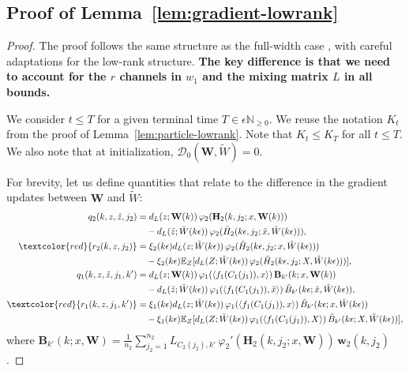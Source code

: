 \subsection{Proof of Lemma~\ref{lem:gradient-lowrank}}

\begin{proof}
The proof follows the same structure as the full-width case \cite{nguyen2020global}, with careful adaptations for the low-rank structure. \textbf{The key difference is that we need to account for the $r$ channels in $w_1$ and the mixing matrix $L$ in all bounds.}

We consider $t \le T$ for a given terminal time $T \in \epsilon\mathbb{N}_{\ge 0}$. We reuse the notation $K_t$ from the proof of Lemma~\ref{lem:particle-lowrank}. Note that $K_t \le K_T$ for all $t \le T$. We also note that at initialization, $\mathscr{D}_0(\mathbf{W}, \tilde{W}) = 0$.

For brevity, let us define quantities that relate to the difference in the gradient updates between $\mathbf{W}$ and $\tilde{W}$:
\begin{align*}
q_2(k, z, \tilde{z}, j_2) &= d_L(z; \mathbf{W}(k))\,\varphi_2(\mathbf{H}_2(k, j_2; x, \mathbf{W}(k)))\\
&\quad - d_L(\tilde{z}; \tilde{W}(k\epsilon))\,\varphi_2(\tilde{H}_2(k\epsilon, j_2; \tilde{x}, \tilde{W}(k\epsilon))),\\
\textcolor{red}{r_2(k, z, j_2)} &= \xi_2(k\epsilon)d_L(z; \tilde{W}(k\epsilon))\,\varphi_2(\tilde{H}_2(k\epsilon, j_2; x, \tilde{W}(k\epsilon)))\\
&\quad - \xi_2(k\epsilon)\mathbb{E}_Z[d_L(Z; \tilde{W}(k\epsilon))\,\varphi_2(\tilde{H}_2(k\epsilon, j_2; X, \tilde{W}(k\epsilon)))],\\
q_1(k, z, \tilde{z}, j_1, k') &= d_L(z; \mathbf{W}(k))\,\varphi_1(\langle f_1(C_1(j_1)), x\rangle)\,\mathbf{B}_{k'}(k; x, \mathbf{W}(k))\\
&\quad - d_L(\tilde{z}; \tilde{W}(k\epsilon))\,\varphi_1(\langle f_1(C_1(j_1)), \tilde{x}\rangle)\,\tilde{B}_{k'}(k\epsilon; \tilde{x}, \tilde{W}(k\epsilon)),\\
\textcolor{red}{r_1(k, z, j_1, k')} &= \xi_1(k\epsilon)d_L(z; \tilde{W}(k\epsilon))\,\varphi_1(\langle f_1(C_1(j_1)), x\rangle)\,\tilde{B}_{k'}(k\epsilon; x, \tilde{W}(k\epsilon))\\
&\quad - \xi_1(k\epsilon)\mathbb{E}_Z[d_L(Z; \tilde{W}(k\epsilon))\,\varphi_1(\langle f_1(C_1(j_1)), X\rangle)\,\tilde{B}_{k'}(k\epsilon; X, \tilde{W}(k\epsilon))],
\end{align*}
where $\mathbf{B}_{k'}(k; x, \mathbf{W}) = \frac{1}{n_2}\sum_{j_2=1}^{n_2} L_{C_2(j_2),k'}\,\varphi_2'(\mathbf{H}_2(k, j_2; x, \mathbf{W}))\,\mathbf{w}_2(k, j_2)$.


\end{proof}
